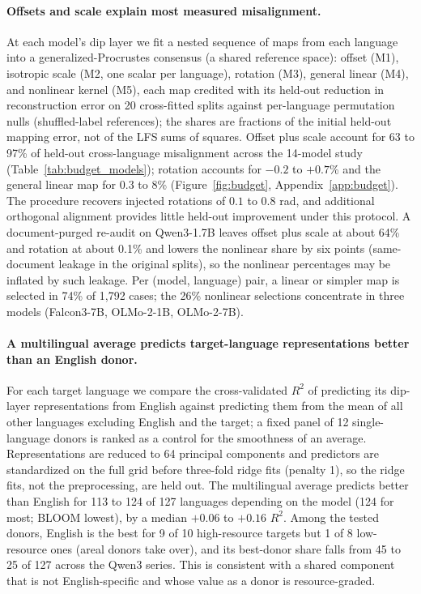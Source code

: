 \documentclass{article} %
\begin{document}
\paragraph{Offsets and scale explain most measured misalignment.} At each model's
dip layer we fit a nested sequence of maps from each language into a
generalized-Procrustes consensus (a shared reference space): offset (M1), isotropic scale (M2, one scalar per language), rotation
(M3), general linear (M4), and nonlinear kernel (M5), each map credited with
its held-out reduction in reconstruction error on 20 cross-fitted splits against per-language permutation nulls (shuffled-label references); the shares are fractions of the initial held-out mapping error, not of the LFS sums of squares. Offset plus scale account for 63 to
97\% of held-out cross-language misalignment across the 14-model study
(Table~\ref{tab:budget_models});
rotation accounts for $-0.2$ to $+0.7$\% and the general linear map for
0.3 to 8\% (Figure~\ref{fig:budget}, Appendix~\ref{app:budget}). The procedure recovers injected
rotations of $0.1$ to $0.8$ rad, and additional orthogonal alignment provides
little held-out improvement under this protocol. A document-purged re-audit on Qwen3-1.7B leaves offset
plus scale at about 64\% and rotation at about 0.1\% and lowers the nonlinear
share by six points (same-document leakage in the original splits), so the nonlinear percentages may be inflated by such leakage. Per (model, language) pair, a
linear or simpler map is selected in 74\% of 1,792 cases; the 26\% nonlinear
selections concentrate in three models (Falcon3-7B, OLMo-2-1B, OLMo-2-7B).

\paragraph{A multilingual average predicts target-language representations better than an English donor.} For each target language we compare the cross-validated $R^2$ of predicting its dip-layer representations from English against predicting them from the mean of all other languages excluding English and the target; a fixed panel of 12 single-language donors is ranked as a control for the smoothness of an average. Representations are reduced to 64 principal components and predictors are standardized on the full grid before three-fold ridge fits (penalty 1), so the ridge fits, not the preprocessing, are held out. The multilingual average predicts better than English for 113 to 124 of 127 languages depending on the model (124 for most; BLOOM lowest), by a median $+0.06$ to $+0.16$ $R^2$. Among the tested donors, English is the best for 9 of 10 high-resource targets but 1 of 8 low-resource ones (areal donors take over), and its best-donor share falls from 45 to 25 of 127 across the Qwen3 series. This is consistent with a shared component that is not English-specific and whose value as a donor is resource-graded.
\end{document}
